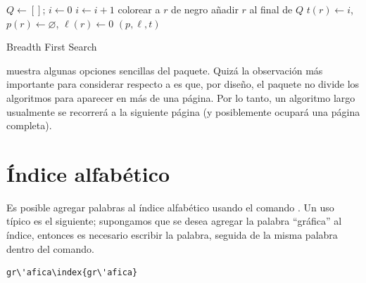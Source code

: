 \begin{algorithm}[ht!]
  \DontPrintSemicolon

  \BlankLine
  $Q \leftarrow []$; $i \leftarrow 0$\;
  $i \leftarrow i+1$\;
  colorear a $r$ de negro\;
  a\~nadir $r$ al final de $Q$\;
  $t(r) \leftarrow i$, $p(r) \leftarrow \varnothing$, $\ell (r) \leftarrow 0$\;
  {
  }
  {\Return $(p,\ell,t)$}
  \caption{Breadth First Search}
  \label{alg:bfs}
\DecMargin{1em}
\end{algorithm}

 muestra algunas opciones sencillas del paquete.   Quiz\'a la
observaci\'on m\'as importante para considerar respecto a  es
que, por dise\~no, el paquete no divide los algoritmos para aparecer en m\'as
de una p\'agina.   Por lo tanto, un algoritmo largo usualmente se recorrer\'a
a la siguiente p\'agina (y posiblemente ocupar\'a una p\'agina completa).

\section{\'Indice alfab\'etico}
\label{sec:indice}

Es posible agregar palabras al \'indice alfab\'etico
usando el comando .   Un uso t\'ipico es el
siguiente; supongamos que se desea agregar la palabra ``gr\'afica'' al \'indice,
entonces es necesario escribir la palabra, seguida de la misma palabra dentro
del comando.
\begin{lstlisting}
gr\'afica\index{gr\'afica}
\end{lstlisting}

